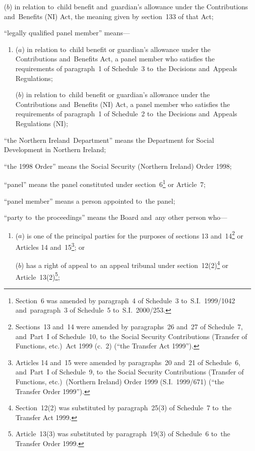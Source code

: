 \documentclass[12pt,a4paper]{article}
\begin{document}
\begin{enumerate}
\begin{enumerate}
($b$) 
in relation to~child benefit and~guardian’s allowance under the Contributions and~Benefits (NI) Act, the meaning given by section~133 of that Act;
\end{enumerate}

“legally qualified panel member” means—
\begin{enumerate}\item[]
($a$) 
in relation to~child benefit or guardian’s allowance under the Contributions and~Benefits Act, a panel member who satisfies the requirements of paragraph~1 of Schedule~3 to~the Decisions and~Appeals Regulations;

($b$) 
in relation to~child benefit or guardian’s allowance under the Contributions and~Benefits (NI) Act, a panel member who satisfies the requirements of paragraph~1 of Schedule~2 to~the Decisions and~Appeals Regulations (NI);
\end{enumerate}

“the Northern Ireland~Department” means the Department for Social Development in Northern Ireland;

“the 1998 Order” means the Social Security (Northern Ireland) Order 1998;

“panel” means the panel constituted under section~6\footnote{Section~6 was amended by paragraph~4 of Schedule~3 to~S.I.~1999/1042 and~paragraph~3 of Schedule~5 to~S.I.~2000/253.} or Article~7;

“panel member” means a person appointed to~the panel;

“party to~the proceedings” means the Board and~any other person who—
\begin{enumerate}\item[]
($a$) 
is one of the principal parties for the purposes of sections 13 and~14\footnote{Sections~13 and~14 were amended by paragraphs~26 and~27 of Schedule~7, and~Part~I of Schedule~10, to~the Social Security Contributions (Transfer of Functions, etc.)\ Act 1999 (c.~2) (“the Transfer Act 1999”).} or Articles 14 and~15\footnote{Articles 14 and~15 were amended by paragraphs~20 and~21 of Schedule~6, and~Part~I of Schedule~9, to~the Social Security Contributions (Transfer of Functions, etc.)\ (Northern Ireland) Order 1999 (S.I.~1999/671) (“the Transfer Order 1999”).}; or

($b$) 
has a right of appeal to~an appeal tribunal under section~12(2)\footnote{Section~12(2) was substituted by paragraph~25(3) of Schedule~7 to~the Transfer Act 1999.} or Article~13(2)\footnote{Article~13(3) was substituted by paragraph~19(3) of Schedule~6 to~the Transfer Order 1999.};
\end{enumerate}


\end{enumerate}
\end{document}
